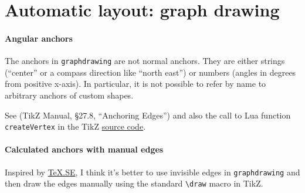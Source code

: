 \documentclass[12pt]{article}
\begin{document}
\section*{Automatic layout: graph drawing}

\usetikzlibrary{graphdrawing}
\usetikzlibrary{graphs}

\paragraph{Angular anchors}

The anchors in \texttt{graphdrawing} are not normal anchors. They are either
strings (``center'' or a compass direction like ``north east'') or numbers
(angles in  degrees from positive x-axis). In particular, it is not possible to
refer by name to arbitrary anchors of custom shapes.

See (TikZ Manual, \S 27.8, ``Anchoring Edges'') and also the call to Lua
function \texttt{createVertex} in the TikZ
\href{http://pgf.cvs.sourceforge.net/viewvc/pgf/pgf/generic/pgf/graphdrawing/tex/pgflibrarygraphdrawing.code.tex?view=markup}{source code}.

\begin{center}
\end{center}

\paragraph{Calculated anchors with manual edges}

Inspired by \href{http://tex.stackexchange.com/a/247825}{TeX.SE}, I think it's
better to use invisible edges in \texttt{graphdrawing} and then draw the edges
manually using the standard \texttt{\textbackslash draw} macro in TikZ.
\end{document}
